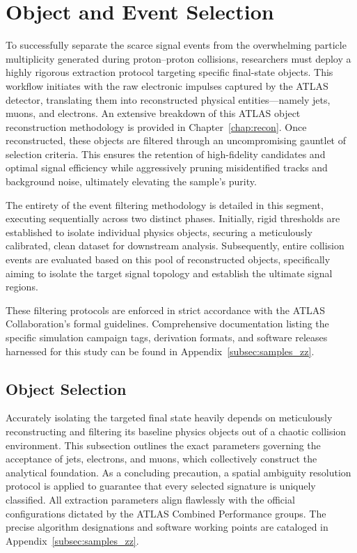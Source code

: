\section{Object and Event Selection} 
\label{sec:llvv_selection}

To successfully separate the scarce signal events from the overwhelming particle multiplicity generated during proton--proton collisions, researchers must deploy a highly rigorous extraction protocol targeting specific final-state objects. This workflow initiates with the raw electronic impulses captured by the ATLAS detector, translating them into reconstructed physical entities—namely jets, muons, and electrons. An extensive breakdown of this ATLAS object reconstruction methodology is provided in Chapter~\ref{chap:recon}. Once reconstructed, these objects are filtered through an uncompromising gauntlet of selection criteria. This ensures the retention of high-fidelity candidates and optimal signal efficiency while aggressively pruning misidentified tracks and background noise, ultimately elevating the sample's purity.

The entirety of the event filtering methodology is detailed in this segment, executing sequentially across two distinct phases. Initially, rigid thresholds are established to isolate individual physics objects, securing a meticulously calibrated, clean dataset for downstream analysis. Subsequently, entire collision events are evaluated based on this pool of reconstructed objects, specifically aiming to isolate the target signal topology and establish the ultimate signal regions.

These filtering protocols are enforced in strict accordance with the ATLAS Collaboration's formal guidelines. Comprehensive documentation listing the specific simulation campaign tags, derivation formats, and software releases harnessed for this study can be found in Appendix~\ref{subsec:samples_zz}.

\subsection{Object Selection}
\label{sec:llvv_object_selection}

Accurately isolating the targeted final state heavily depends on meticulously reconstructing and filtering its baseline physics objects out of a chaotic collision environment. This subsection outlines the exact parameters governing the acceptance of jets, electrons, and muons, which collectively construct the analytical foundation. As a concluding precaution, a spatial ambiguity resolution protocol is applied to guarantee that every selected signature is uniquely classified. All extraction parameters align flawlessly with the official configurations dictated by the ATLAS Combined Performance groups. The precise algorithm designations and software working points are cataloged in Appendix~\ref{subsec:samples_zz}.


